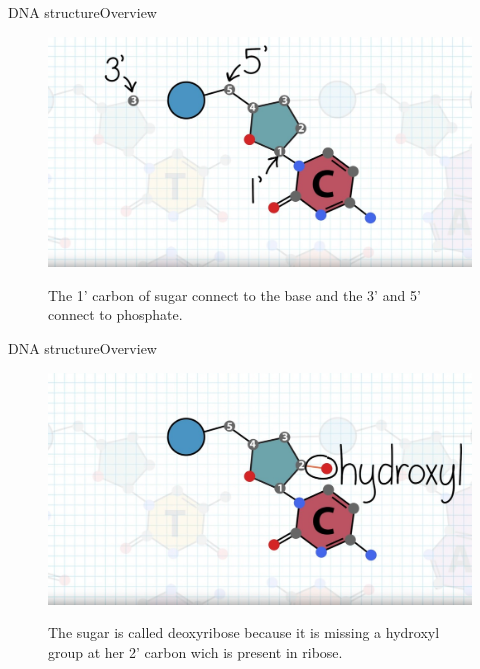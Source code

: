\documentclass[10pt]{beamer}
\begin{document}
{%
\begin{frame}{DNA structure}{Overview}
	\begin{figure}[]
		\centering
		\includegraphics[width=\textwidth,height=0.7\textheight,keepaspectratio]{img/introduction/dna12.jpg}
		\label{img:mot2}
		\caption{The 1' carbon of sugar connect to the base and the 3' and 5' connect to phosphate. }
	\end{figure}
\end{frame}

\begin{frame}{DNA structure}{Overview}
	\begin{figure}[]
		\centering
		\includegraphics[width=\textwidth,height=0.7\textheight,keepaspectratio]{img/introduction/dna13.jpg}
		\label{img:mot2}
		\caption{The sugar is called deoxyribose because it is missing a hydroxyl group at her 2' carbon wich is present in ribose.}
	\end{figure}
\end{frame}

}
\end{document}

